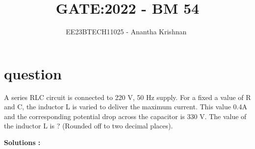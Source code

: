 \documentclass[journal,12pt,onecolumn]{IEEEtran}
\theoremstyle{remark}
\begin{document}

\vspace{3cm}

\title{GATE:2022 - BM 54 }
\author{EE23BTECH11025 - Anantha Krishnan $^{}$%
}
\maketitle
\bigskip



\section{question}

A series RLC circuit is connected to 220 V, 50 Hz supply. For a fixed a value of R and C, the inductor L is varied to deliver the maximum current. This value 0.4A and the corresponding potential drop across the capacitor is 330 V. The value of the inductor L is ? (Rounded off to two decimal places).
 



\textbf{Solutions :}




    


    
    \newcommand{\midlabelline}[3]{
   \node (midlabel) at ($ (#1)!.5!(#2) $) {#3};
   \draw[latex-] (#1) --  (midlabel);
   \draw[-latex] (midlabel) -- (#2);
}
\end{document}
